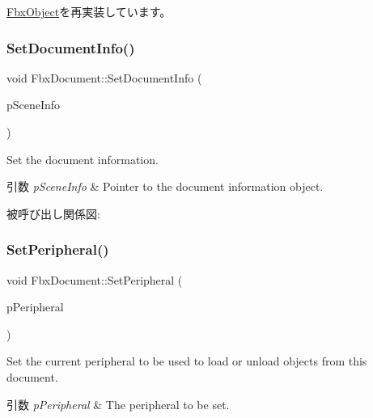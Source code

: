 \hyperlink{class_fbx_object_a5f01a45e03bbf2c243ae9ef71d9050cf}{Fbx\+Object}を再実装しています。

\mbox{\label{class_fbx_document_a6dafa0189db8b2088dc46965b210d613}} 
\subsubsection{\texorpdfstring{Set\+Document\+Info()}{SetDocumentInfo()}}
{\footnotesize\ttfamily void Fbx\+Document\+::\+Set\+Document\+Info (\begin{DoxyParamCaption}\item[{\hyperlink{class_fbx_document_info}{Fbx\+Document\+Info} $\ast$}]{p\+Scene\+Info }\end{DoxyParamCaption})}

Set the document information. 
\begin{DoxyParams}{引数}
{\em p\+Scene\+Info} & Pointer to the document information object. \\
\hline
\end{DoxyParams}
被呼び出し関係図\+:
\mbox{\label{class_fbx_document_aff0bbbef68acec40c0a2d49a98021f0a}} 
\subsubsection{\texorpdfstring{Set\+Peripheral()}{SetPeripheral()}}
{\footnotesize\ttfamily void Fbx\+Document\+::\+Set\+Peripheral (\begin{DoxyParamCaption}\item[{\hyperlink{class_fbx_peripheral}{Fbx\+Peripheral} $\ast$}]{p\+Peripheral }\end{DoxyParamCaption})}

Set the current peripheral to be used to load or unload objects from this document. 
\begin{DoxyParams}{引数}
{\em p\+Peripheral} & The peripheral to be set. \\
\hline
\end{DoxyParams}
\mbox{\label{class_fbx_document_ace5043bd6c9883d00cfb6a2eb6d74d5c}} 
